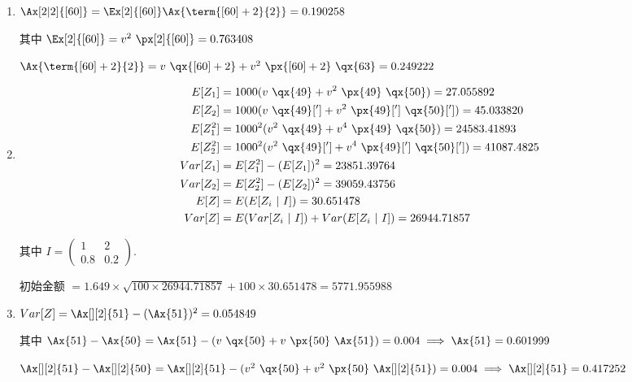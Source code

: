 \documentclass[utf8]{ctexart}
\begin{document}
\begin{enumerate}
    \item $\Ax[2|2]{[60]} = \Ex[2]{[60]}\Ax{\term{[60]+2}{2}} = 0.190258$

    其中 $\Ex[2]{[60]} = v^{2}~\px[2]{[60]} = 0.763408$

    $\Ax{\term{[60]+2}{2}} = v~\qx{[60]+2} + v^{2}~\px{[60]+2}~\qx{63} = 0.249222$

    \item \begin{align*}
        E[Z_{1}] & = 1000(v~\qx{49} + v^{2}~\px{49}~\qx{50}) = 27.055892\\
        E[Z_{2}] & = 1000(v~\qx{49}['] + v^{2}~\px{49}[']~\qx{50}[']) = 45.033820\\
        E[Z_{1}^{2}] & = 1000^{2}(v^{2}~\qx{49} + v^{4}~\px{49}~\qx{50}) = 24583.41893\\
        E[Z_{2}^{2}] & = 1000^{2}(v^{2}~\qx{49}['] + v^{4}~\px{49}[']~\qx{50}[']) = 41087.4825\\
        Var[Z_{1}] & = E[Z_{1}^{2}] - (E[Z_{1}])^{2} = 23851.39764\\
        Var[Z_{2}] & = E[Z_{2}^{2}] - (E[Z_{2}])^{2} = 39059.43756\\
        E[Z] & = E(E[Z_{i}~|~I]) = 30.651478\\
        Var[Z] & = E(Var[Z_{i}~|~I]) + Var(E[Z_{i}~|~I]) = 26944.71857
    \end{align*}

    其中 $I = \begin{pmatrix} 1 & 2\\ 0.8 & 0.2\end{pmatrix}$.

    初始金额 $= 1.649\times\sqrt{100\times 26944.71857} + 100\times 30.651478 = 5771.955988$

    \item $Var[Z] = \Ax[][2]{51} - (\Ax{51})^{2} = 0.054849$

    其中 $\Ax{51}-\Ax{50} = \Ax{51} - (v~\qx{50}+v~\px{50}~\Ax{51}) = 0.004\implies \Ax{51} = 0.601999$

    $\Ax[][2]{51}-\Ax[][2]{50} = \Ax[][2]{51} - (v^{2}~\qx{50}+v^{2}~\px{50}~\Ax[][2]{51}) = 0.004\implies \Ax[][2]{51} = 0.417252$

\end{enumerate}
\end{document}
